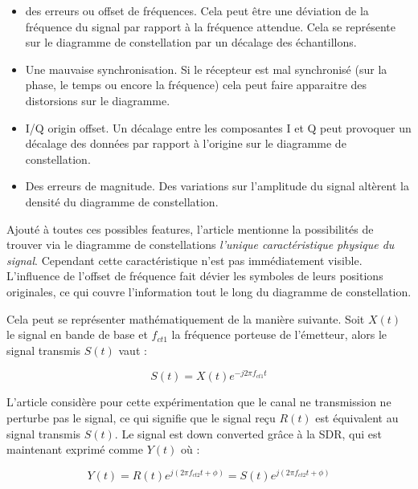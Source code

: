 \begin{itemize}
\item des erreurs ou offset de fréquences. Cela peut être une déviation de la fréquence du signal par rapport à la fréquence attendue. Cela se représente sur le diagramme de constellation par un décalage des échantillons. 
\item Une mauvaise synchronisation. Si le récepteur est mal synchronisé (sur la phase, le temps ou encore la fréquence) cela peut faire apparaitre des distorsions sur le diagramme.
\item I/Q origin offset. Un décalage entre les composantes I et Q peut provoquer un décalage des données par rapport à l'origine sur le diagramme de constellation.
\item Des erreurs de magnitude. Des variations sur l'amplitude du signal altèrent la densité du diagramme de constellation.
\end{itemize}

\vspace{0.1cm}

Ajouté à toutes ces possibles features, l'article mentionne la possibilités de trouver via le diagramme de constellations \textit{l'unique caractéristique physique du signal}. Cependant cette caractéristique n'est pas immédiatement visible. L'influence de l'offset de fréquence fait dévier les symboles de leurs positions originales, ce qui couvre l'information tout le long du diagramme de constellation.

\vspace{0.1cm}

Cela peut se représenter mathématiquement de la manière suivante. Soit $X(t)$ le signal en bande de base et $f_{ct1}$ la fréquence porteuse de l'émetteur, alors le signal transmis $S(t)$ vaut :

\begin{equation}\label{eq4000}
	S(t) = X(t) e^{-j2\pi f_{ct1} t}
\end{equation} 

L'article considère pour cette expérimentation que le canal ne transmission ne perturbe pas le signal, ce qui signifie que le signal reçu $R(t)$ est équivalent au signal transmis $S(t)$. Le signal est down converted grâce à la SDR, qui est maintenant exprimé comme $Y(t)$ où :

\begin{equation}\label{eq4001}
	Y(t) = R(t) e^{j(2\pi f_{ct2} t + \phi)} = S(t) e^{j(2\pi f_{ct2} t + \phi)}
\end{equation} 

